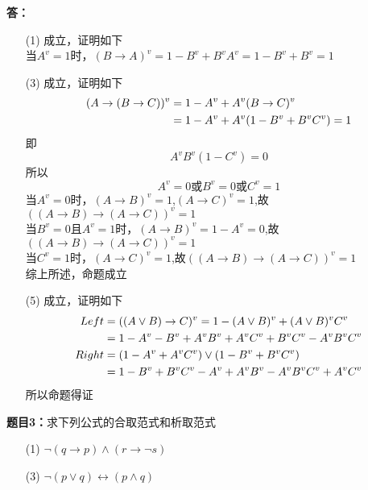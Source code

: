 \documentclass[10pt,CCT]{ctexart}
\begin{document}
\vspace{5pt}
\noindent
{\bf 答：}
\begin{enumerate}
    \item [(1)] 成立，证明如下\\当$A^{v}=1$时，$(B \rightarrow A)^{v}=1-B^{v}+B^{v}A^{v}=1-B^{v}+B^{v}=1$
    \item [(3)] 成立，证明如下
    \begin{equation}
        \begin{aligned}
            (A \rightarrow (B \rightarrow C))^{v}&=1-A^{v}+A^{v}(B \rightarrow C)^{v}\\
            &=1-A^{v}+A^{v}(1-B^{v}+B^{v}C^{v})=1
        \end{aligned}\notag
    \end{equation}
    即$$A^{v}B^{v}(1-C^{v})=0$$
    所以$$A^{v}=0\mbox{或}B^{v}=0\mbox{或}C^{v}=1$$
    当$A^{v}=0$时，$(A \rightarrow B)^{v}=1$,$(A \rightarrow C)^{v}=1$,故$((A\rightarrow B) \rightarrow (A \rightarrow C))^{v}=1$\\
    当$B^{v}=0$且$A^{v}=1$时，$(A \rightarrow B)^{v}=1-A^{v}=0$,故$((A\rightarrow B) \rightarrow (A \rightarrow C))^{v}=1$\\
    当$C^{v}=1$时，$(A \rightarrow C)^{v}=1$,故$((A\rightarrow B) \rightarrow (A \rightarrow C))^{v}=1$\\
    综上所述，命题成立
    \item [(5)] 成立，证明如下
    \begin{equation}
        \begin{aligned}
            Left &= ((A \vee B) \rightarrow C)^{v}=1-(A \vee B)^{v}+(A \vee B)^{v}C^{v}\\
            &= 1-A^{v}-B^{v}+A^{v}B^{v}+A^{v}C^{v}+B^{v}C^{v}-A^{v}B^{v}C^{v}\\
            Right &= (1-A^{v}+A^{v}C^{v}) \vee (1-B^{v}+B^{v}C^{v})\\
            &= 1-B^{v}+B^{v}C^{v}-A^{v}+A^{v}B^{v}-A^{v}B^{v}C^{v}+A^{v}C^{v}
        \end{aligned}\notag
    \end{equation}
    所以命题得证
\end{enumerate}
\noindent


\vspace{10pt}
\noindent
{\bf 题目3：}求下列公式的合取范式和析取范式
\begin{enumerate}
    \item[(1)] $\neg(q\rightarrow p) \wedge (r \rightarrow \neg s)$
    \item[(3)] $\neg(p\vee q) \leftrightarrow (p \wedge q)$
\end{enumerate}
\end{document}
